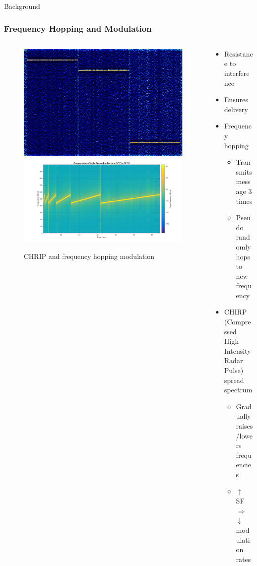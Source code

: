 \documentclass{beamer}
\begin{document}
\begin{frame}{Background}
  \frametitle{Frequency Hopping and Modulation}
  \begin{columns}
    \begin{column}{0.5\textwidth}
      \begin{figure}[htbp]
        \centering
        \includegraphics[width=.7\textwidth]{Sigfox_Spectrum_Analysis.jpg}
        \includegraphics[width=.9\textwidth]{Chirp.png}
        \caption{CHRIP and frequency hopping modulation}
        \label{fig:Frequency_hopping_and_modulation}
      \end{figure}
  \end{column}
    \begin{column}{0.5\textwidth}
      \begin{itemize}
        \item Resistance to interference
        \item Ensures delivery
        \item Frequency hopping
          \begin{itemize}
            \item Transmits message 3 times
            \item Pseudo randomly hops to new frequency
          \end{itemize}
        \item CHIRP (Compressed High Intensity Radar Pulse) spread spectrum
          \begin{itemize}
            \item Gradually raises/lowers frequencies
            \item $\uparrow$ SF $\Rightarrow$ $\downarrow$ modulation rates
          \end{itemize}
      \end{itemize}
    \end{column}
  \end{columns}
\end{frame}
\end{document}
